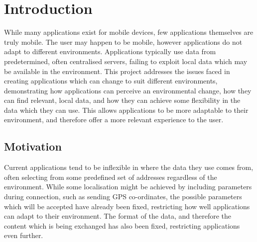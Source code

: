 \documentclass[12pt,twoside,notitlepage]{report}
\begin{document}
\bigskip
\bigskip
{}

\bigskip
\bigskip
{}

\cleardoublepage

\tableofcontents

\listoffigures

\newpage


\cleardoublepage        %

\setcounter{page}{1}
\pagestyle{headings}

\chapter{Introduction}

While many applications exist for mobile devices, few applications themselves are truly mobile. 
The user may happen to be mobile, however applications do not adapt to different environments. 
Applications typically use data from predetermined, often centralised servers, failing to exploit local data which may be available in the environment. 
This project addresses the issues faced in creating applications which can change to suit different environments, demonstrating how applications can perceive an environmental change, how they can find relevant, local data, and how they can achieve some flexibility in the data which they can use. 
This allows applications to be more adaptable to their environment, and therefore offer a more relevant experience to the user. 

\section{Motivation}

Current applications tend to be inflexible in where the data they use comes from, often selecting from some predefined set of addresses regardless of the environment. 
While some localisation might be achieved by including parameters during connection, such as sending GPS co-ordinates, the possible parameters which will be accepted have already been fixed, restricting how well applications can adapt to their environment. 
The format of the data, and therefore the content which is being exchanged has also been fixed, restricting applications even further.
\end{document}
